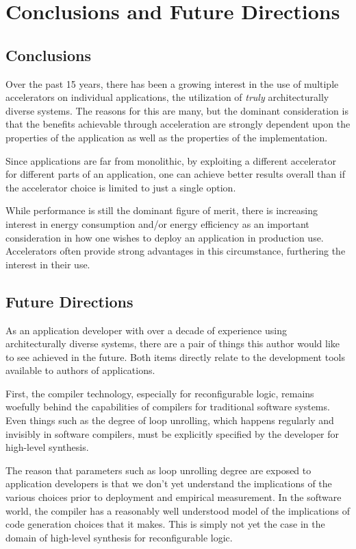 \section{Conclusions and Future Directions}
\label{sec:conclude}

\subsection{Conclusions}

Over the past 15 years, there has been a growing interest in the use of
multiple accelerators on individual applications, the utilization of
\emph{truly} architecturally diverse systems.  The reasons for this
are many, but the dominant consideration is that the benefits achievable
through acceleration are strongly dependent upon the properties of the
application as well as the properties of the implementation.

Since applications are far from monolithic, by exploiting a different
accelerator for different parts of an application, one can achieve
better results overall than if the accelerator choice is limited to just
a single option.

While performance is still the dominant figure of merit, there is
increasing interest in energy consumption and/or energy efficiency as
an important consideration in how one wishes to deploy an application
in production use.  Accelerators often provide strong advantages 
in this circumstance, furthering the interest in their use.

\subsection{Future Directions}


As an application developer with over a decade of experience using
architecturally diverse systems, there are a pair of things this
author would like to see achieved in the future. Both items directly
relate to the development tools available to authors of applications.

First, the compiler technology, especially for reconfigurable logic,
remains woefully behind the capabilities of compilers for traditional
software systems.  Even things such as the degree of loop unrolling,
which happens regularly and invisibly in software compilers, must be
explicitly specified by the developer for high-level synthesis.

The reason that parameters such as loop unrolling degree are exposed
to application developers is that we don't yet understand the
implications of the various choices prior to deployment and empirical
measurement.  In the software world, the compiler has a reasonably
well understood model of the implications of code generation choices
that it makes.  This is simply not yet the case in the domain of
high-level synthesis for reconfigurable logic.

